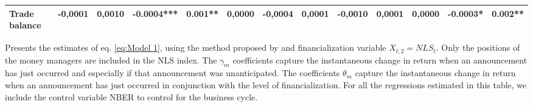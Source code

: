 \begin{landscape}
\begin{table}[]
{\begin{tabular}{@{}lllllllllllll@{}}
\textbf{Trade balance}            & -0,0001                                 & 0,0010                                  & -0.0004***                              & 0.001**                                 & 0,0000                                  & -0,0004                                 & 0,0001                                  & -0,0010                                 & 0,0001                                  & 0,0000                                  & -0.0003*                                & 0.002**                                 \\ \bottomrule
\end{tabular}%
}

\begin{tablenotes}
        \singlespacing
        \footnotesize
       Presents the estimates of eq. \ref{eq:Model 1}, using the method proposed by \citep{kurov2019price} and financialization variable $X_{t,2}=NLS_t$. Only the positions of the money managers are included in the NLS index. The $\gamma_m$ coefficients capture the instantaneous change in return when an announcement has just occurred and especially if that announcement was unanticipated. The coefficients $\theta_m$ capture the instantaneous change in return when an announcement has just occurred in conjunction with the level of financialization.
For all the regressions estimated in this table, we include the control variable NBER to control for the business cycle. 


    \end{tablenotes}
\end{table}
\end{landscape}

